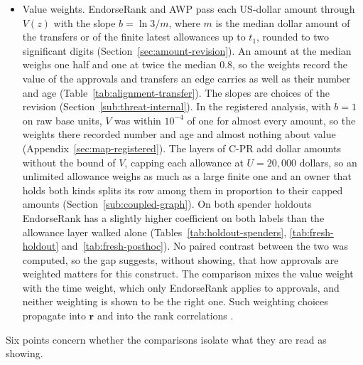\begin{itemize}
\item Value weights. EndorseRank and AWP pass each US-dollar amount through $V(z)$ with the slope $b=\ln 3/m$, where $m$ is the median dollar amount of the transfers or of the finite latest allowances up to $t_1$, rounded to two significant digits (Section~\ref{sec:amount-revision}). An amount at the median weighs one half and one at twice the median $0.8$, so the weights record the value of the approvals and transfers an edge carries as well as their number and age (Table~\ref{tab:alignment-transfer}). The slopes are choices of the revision (Section~\ref{sub:threat-internal}). In the registered analysis, with $b=1$ on raw base units, $V$ was within $10^{-4}$ of one for almost every amount, so the weights there recorded number and age and almost nothing about value (Appendix~\ref{sec:map-registered}). The layers of C-PR add dollar amounts without the bound of $V$, capping each allowance at $U=20{,}000$ dollars, so an unlimited allowance weighs as much as a large finite one and an owner that holds both kinds splits its row among them in proportion to their capped amounts (Section~\ref{sub:coupled-graph}). On both spender holdouts EndorseRank has a slightly higher coefficient on both labels than the allowance layer walked alone (Tables~\ref{tab:holdout-spenders}, \ref{tab:fresh-holdout} and~\ref{tab:fresh-posthoc}). No paired contrast between the two was computed, so the gap suggests, without showing, that how approvals are weighted matters for this construct. The comparison mixes the value weight with the time weight, which only EndorseRank applies to approvals, and neither weighting is shown to be the right one. Such weighting choices propagate into $\mathbf{r}$ and into the rank correlations \parencite{langville2006pagerank}.
\end{itemize}


Six points concern whether the comparisons isolate what they are read as showing.

